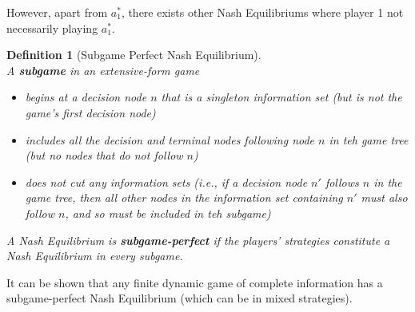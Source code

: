 \documentclass[12pt]{article}
\newtheorem{definition}{Definition}[section]
\theoremstyle{definition}
\begin{document}
However, apart from $a_1^\ast$, there exists other Nash Equilibriums where player 1 not necessarily playing $a_1^\ast$.
\begin{definition}[Subgame Perfect Nash Equilibrium]
\hfill\\\normalfont A \textbf{subgame} in an extensive-form game
\begin{itemize}
  \item begins at a decision node $n$ that is a singleton information set (but is not the game's first decision node)
  \item includes all the decision and terminal nodes following node $n$ in teh game tree (but no nodes that do not follow $n$)
  \item does not cut any information sets (i.e., if a decision node $n'$ follows $n$ in the game tree, then all other nodes in the information set containing $n'$ must also follow $n$, and so must be included in teh subgame)
\end{itemize}
A Nash Equilibrium is \textbf{subgame-perfect} if the players' strategies constitute a Nash Equilibrium in every subgame.
\end{definition}
It can be shown that any finite dynamic game of complete information has a subgame-perfect Nash Equilibrium (which can be in mixed strategies).
\end{document}
